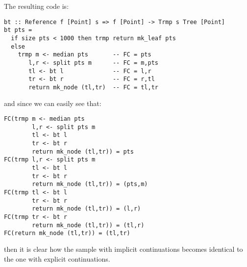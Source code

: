 The resulting code is:

\begin{lstlisting}
bt :: Reference f [Point] s => f [Point] -> Trmp s Tree [Point]
bt pts =
  if size pts < 1000 then trmp return mk_leaf pts
  else
    trmp m <- median pts       -- FC = pts
       l,r <- split pts m      -- FC = m,pts
       tl <- bt l              -- FC = l,r
       tr <- bt r              -- FC = r,tl
       return mk_node (tl,tr)  -- FC = tl,tr
\end{lstlisting}

and since we can easily see that:

\begin{lstlisting}
FC(trmp m <- median pts
        l,r <- split pts m 
        tl <- bt l 
        tr <- bt r 
        return mk_node (tl,tr)) = pts
FC(trmp l,r <- split pts m 
        tl <- bt l 
        tr <- bt r 
        return mk_node (tl,tr)) = (pts,m)
FC(trmp tl <- bt l 
        tr <- bt r 
        return mk_node (tl,tr)) = (l,r)
FC(trmp tr <- bt r
        return mk_node (tl,tr)) = (tl,r)
FC(return mk_node (tl,tr)) = (tl,tr)
\end{lstlisting}

then it is clear how the sample with implicit continuations becomes identical to the one with explicit continuations.

